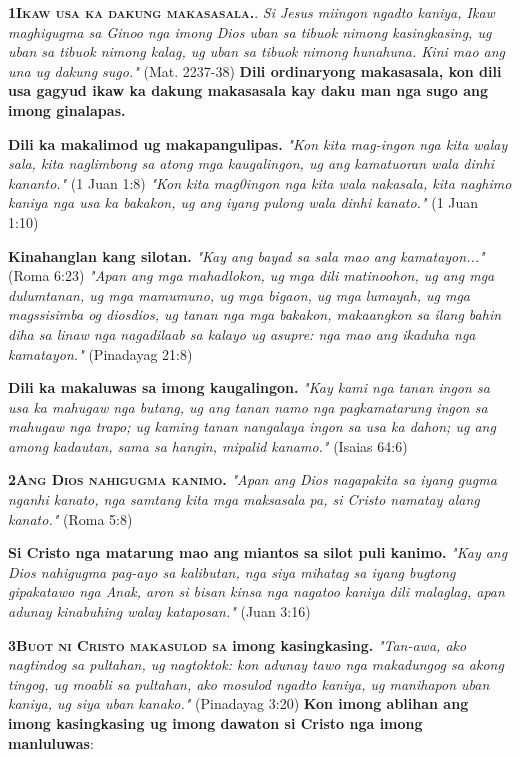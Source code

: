 \documentclass[9pt]{article}
\def\nin{\noindent}
\begin{document}
	\begin{multicols*}{2}
	\lettrine[lines=3]{\textbf{1}}{\textbf{Ikaw usa ka dakung makasasala.}}. \textit{Si Jesus miingon ngadto kaniya, Ikaw maghigugma sa Ginoo nga imong Dios uban sa tibuok nimong kasingkasing, ug uban sa tibuok nimong kalag, ug uban sa tibuok nimong hunahuna. Kini mao ang una ug dakung sugo."} (Mat. 2237-38) \textbf{Dili ordinaryong makasasala, kon dili usa gagyud ikaw ka dakung makasasala kay daku man nga sugo ang imong ginalapas.}
	
	\nin\textbf{Dili ka makalimod ug makapangulipas.} \textit{"Kon kita mag-ingon nga kita walay sala, kita naglimbong sa atong mga kaugalingon, ug ang kamatuoran wala dinhi kananto."} (1 Juan 1:8) \textit{"Kon kita mag0ingon nga kita wala nakasala, kita naghimo kaniya nga usa ka bakakon, ug ang iyang pulong wala dinhi kanato."} (1 Juan 1:10)
	
	\nin\textbf{Kinahanglan kang silotan.} \textit{"Kay ang bayad sa sala mao ang kamatayon..."} (Roma 6:23) \textit{"Apan ang mga mahadlokon, ug mga dili matinoohon, ug ang mga dulumtanan, ug mga mamumuno, ug mga bigaon, ug mga lumayah, ug mga magssisimba og diosdios, ug tanan nga mga bakakon, makaangkon sa ilang bahin diha sa linaw nga nagadilaab sa kalayo ug asupre: nga mao ang ikaduha nga kamatayon."} (Pinadayag 21:8)
	
	\nin\textbf{Dili ka makaluwas sa imong kaugalingon.} \textit{"Kay kami nga tanan ingon sa usa ka mahugaw nga butang, ug ang tanan namo nga pagkamatarung ingon sa mahugaw nga trapo; ug kaming tanan nangalaya ingon sa usa ka dahon; ug ang among kadautan, sama sa hangin, mipalid kanamo."} (Isaias 64:6)
	
	\lettrine[lines=3]{\textbf{2}}{\textbf{Ang Dios nahigugma kanimo.}}  \textit{"Apan ang Dios nagapakita sa iyang gugma nganhi kanato, nga samtang kita mga maksasala pa, si Cristo namatay alang kanato."} (Roma 5:8)
	
	\nin\textbf{Si Cristo nga matarung mao ang miantos sa silot puli kanimo.} \textit{"Kay ang Dios nahigugma pag-ayo sa kalibutan, nga siya mihatag sa iyang bugtong gipakatawo nga Anak, aron si bisan kinsa nga nagatoo kaniya dili malaglag, apan adunay kinabuhing walay kataposan."} (Juan 3:16)
	
	\lettrine[lines=3]{\textbf{3}}{\textbf{Buot ni Cristo makasulod sa }} \textbf{imong kasingkasing.}  \textit{"Tan-awa, ako nagtindog sa pultahan, ug nagtoktok: kon adunay tawo nga makadungog sa akong tingog, ug moabli sa pultahan, ako mosulod ngadto kaniya, ug manihapon uban kaniya, ug siya uban kanako."} (Pinadayag 3:20) \textbf{Kon imong ablihan ang imong kasingkasing ug imong dawaton si Cristo nga imong manluluwas}:
	

\end{multicols*}
\end{document}
